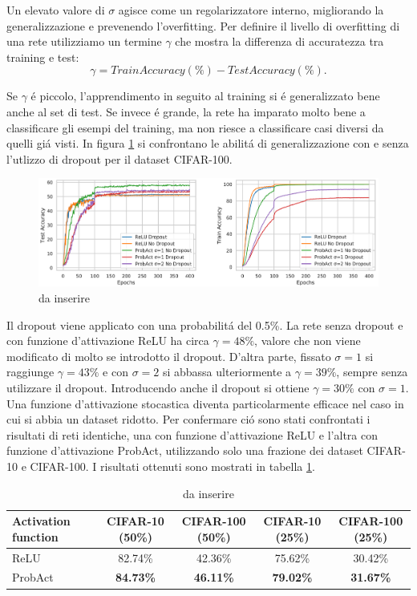 \documentclass[a4paper,10pt]{article}
\begin{document}
  Un elevato valore di $\sigma$ agisce come un regolarizzatore interno, migliorando la generalizzazione e prevenendo l'overfitting. Per definire il livello di overfitting di una rete utilizziamo un termine $\gamma$ che mostra la differenza di accuratezza tra training e test:
  \begin{equation}
   \gamma = TrainAccuracy(\%) - TestAccuracy(\%).
  \end{equation}
  
  Se $\gamma$ \'e piccolo, l'apprendimento in seguito al training si \'e generalizzato bene anche al set di test. Se invece \'e grande, la rete ha imparato molto bene a classificare gli esempi del training, ma non riesce a classificare casi diversi da quelli gi\'a visti. In figura \ref{WithWithoutDropoutpng} si confrontano le abilit\'a di generalizzazione con e senza l'utlizzo di dropout per il dataset CIFAR-100. 
  \begin{figure}[h!]
   \centering
   \includegraphics[width=\linewidth]{WithWithoutDropout.png} 
   \caption{da inserire}
  \label{WithWithoutDropoutpng}
  \end{figure} 
  
  
  Il dropout viene applicato con una probabilit\'a del 0.5\%. La rete senza dropout e con funzione d'attivazione ReLU ha circa $\gamma = 48\%$, valore che non viene modificato di molto se introdotto il dropout. D'altra parte, fissato $\sigma = 1$ si raggiunge $\gamma = 43\%$ e con $\sigma = 2$ si abbassa ulteriormente a $\gamma = 39\%$, sempre senza utilizzare il dropout. Introducendo anche il dropout si ottiene $\gamma = 30\%$ con $\sigma = 1$.
  Una funzione d'attivazione stocastica diventa particolarmente efficace nel caso in cui si abbia un dataset ridotto. Per confermare ci\'o sono stati confrontati i risultati di reti identiche, una con funzione d'attivazione ReLU e l'altra con funzione d'attivazione ProbAct, utilizzando solo una frazione dei dataset CIFAR-10 e CIFAR-100. I risultati ottenuti sono mostrati in tabella \ref{PartialDatasetTab}.
  \begin{table}[h]\caption{da inserire} \label{PartialDatasetTab}
   \centering
   \begin{tabular}[h]{|l|c|c|c|c|}
    \hline
    Activation function & CIFAR-10 (50\%) & CIFAR-100 (50\%) & CIFAR-10 (25\%) & CIFAR-100 (25\%) \\ \hline
    ReLU & 82.74\% & 42.36\% & 75.62\% & 30.42\% \\ 
    ProbAct & \textbf{84.73\%} & \textbf{46.11\%} & \textbf{79.02\%} & \textbf{31.67\%} \\ \hline
   \end{tabular}
  \end{table}
 
\end{document}
